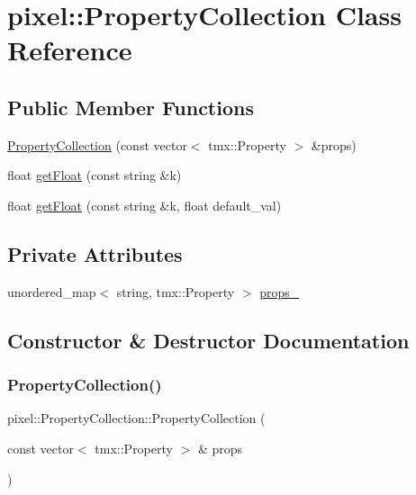 \hypertarget{classpixel_1_1_property_collection}{}\section{pixel\+:\+:Property\+Collection Class Reference}
\label{classpixel_1_1_property_collection}
\subsection*{Public Member Functions}
\begin{DoxyCompactItemize}
\item 
\hyperlink{classpixel_1_1_property_collection_a9f122a6f3ad8409b781a2e18b5ad45a9}{Property\+Collection} (const vector$<$ tmx\+::\+Property $>$ \&props)
\item 
float \hyperlink{classpixel_1_1_property_collection_a076152a8f28cb9a1955c3fef8fed1e95}{get\+Float} (const string \&k)
\item 
float \hyperlink{classpixel_1_1_property_collection_a552df806ee1afa23d748b876c19a52f8}{get\+Float} (const string \&k, float default\+\_\+val)
\end{DoxyCompactItemize}
\subsection*{Private Attributes}
\begin{DoxyCompactItemize}
\item 
unordered\+\_\+map$<$ string, tmx\+::\+Property $>$ \hyperlink{classpixel_1_1_property_collection_add80655d2ec83c818d96dc88d56463dc}{props\+\_\+}
\end{DoxyCompactItemize}


\subsection{Constructor \& Destructor Documentation}
\mbox{\label{classpixel_1_1_property_collection_a9f122a6f3ad8409b781a2e18b5ad45a9}} 
\subsubsection{\texorpdfstring{Property\+Collection()}{PropertyCollection()}}
{\footnotesize\ttfamily pixel\+::\+Property\+Collection\+::\+Property\+Collection (\begin{DoxyParamCaption}\item[{const vector$<$ tmx\+::\+Property $>$ \&}]{props }\end{DoxyParamCaption})\hspace{0.3cm}{\ttfamily [inline]}}



